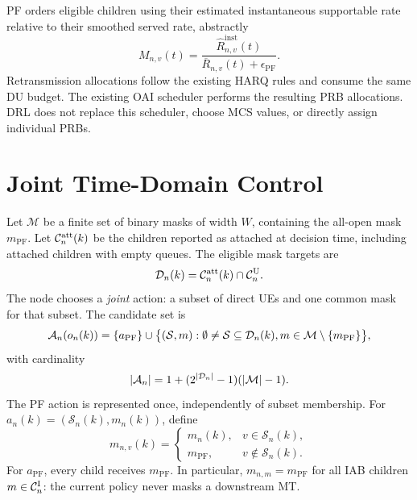 \begin{EnChapter}
PF orders eligible children using their estimated instantaneous supportable rate
relative to their smoothed served rate, abstractly
\begin{equation}
  M_{n,v}(t)=\frac{\widehat R_{n,v}^{\mathrm{inst}}(t)}
                    {\overline R_{n,v}(t)+\epsilon_{\mathrm{PF}}}.
  \label{eq:pf-metric}
\end{equation}
Retransmission allocations follow the existing HARQ rules and consume the same
DU budget. The existing OAI scheduler performs the resulting PRB allocations. DRL does not
replace this scheduler, choose MCS values, or directly assign individual PRBs.

\section{Joint Time-Domain Control}
\label{subsec:action}

Let $\mathcal{M}$ be a finite set of binary masks of width $W$, containing the
all-open mask $m_{\mathrm{PF}}$. Let $\mathcal{C}_n^{\mathrm{att}}(k)$ be the children
reported as attached at decision time, including attached children with empty
queues. The eligible mask targets are
\begin{equation}
  \mathcal{D}_n(k)=\mathcal{C}_n^{\mathrm{att}}(k)\cap\mathcal{C}_n^{\mathrm{U}}.
\end{equation}
The node chooses a \emph{joint} action: a subset of direct UEs and one common mask
for that subset. The candidate set is
\begin{equation}
  \mathcal{A}_n(o_n(k))=\{a_{\mathrm{PF}}\}\cup
  \bigl\{(\mathcal{S},m):\emptyset\ne\mathcal{S}\subseteq\mathcal{D}_n(k),
                         m\in\mathcal{M}\setminus\{m_{\mathrm{PF}}\}\bigr\},
  \label{eq:action-set}
\end{equation}
with cardinality
\begin{equation}
  |\mathcal{A}_n|=1+(2^{|\mathcal{D}_n|}-1)(|\mathcal{M}|-1).
  \label{eq:action-count}
\end{equation}
The PF action is represented once, independently of subset membership.
For $a_n(k)=(\mathcal{S}_n(k),m_n(k))$, define
\begin{equation}
  m_{n,v}(k)=
  \begin{cases}
    m_n(k),&v\in\mathcal{S}_n(k),\\
    m_{\mathrm{PF}},&v\notin\mathcal{S}_n(k).
  \end{cases}
  \label{eq:child-mask}
\end{equation}
For $a_{\mathrm{PF}}$, every child receives $m_{\mathrm{PF}}$.
In particular, $m_{n,m}=m_{\mathrm{PF}}$ for all IAB children
$m\in\mathcal{C}_n^{\mathrm{I}}$: the current policy never masks a downstream MT.


\end{EnChapter}
